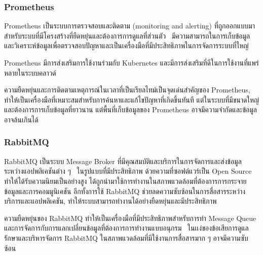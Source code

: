\documentclass[12pt,oneside,openright,a4paper]{cpe-thai-project}
\begin{document}
        \subsubsection{Prometheus}
            \begin{flushleft}
                Prometheus เป็นระบบการตรวจสอบและติดตาม (monitoring and alerting) ที่ถูกออกแบบมาสำหรับระบบที่มีโครงสร้างที่ยืดหยุ่นและต้องการการดูแลที่ส่วนตัว~\cite{prometheus} มีความสามารถในการเก็บข้อมูลและวิเคราะห์ข้อมูลเพื่อตรวจสอบปัญหาและเป็นเครื่องมือที่มีประสิทธิภาพในการจัดการระบบที่ใหญ่ 
            \begin{flushleft}
                Prometheus มีการส่งเสริมการใช้งานร่วมกับ Kubernetes และมีการส่งเสริมที่ดีในการใช้งานที่แพร่หลายในระบบคลาวด์
            \end{flushleft}
            \end{flushleft}
            \begin{flushleft}
                ความยืดหยุ่นและการติดตามเหตุการณ์ในเวลาที่เป็นเรียลไทม์เป็นจุดเด่นสำคัญของ Prometheus, ทำให้เป็นเครื่องมือที่เหมาะสมสำหรับการค้นหาและแก้ไขปัญหาที่เกิดขึ้นทันที แต่ในระบบที่มีขนาดใหญ่และต้องการการเก็บข้อมูลที่ยาวนาน แต่พื้นที่เก็บข้อมูลของ Prometheus อาจมีความจำกัดและข้อมูลอาจล้นเกินได้
            \end{flushleft}

        \subsubsection{RabbitMQ}
            \begin{flushleft}
                RabbitMQ เป็นระบบ Message Broker ที่มีคุณสมบัติและบริการในการจัดการและส่งข้อมูลระหว่างแอปพลิเคชันต่าง ๆ~\cite{rabbitmq} ในรูปแบบที่มีประสิทธิภาพ ด้วยความที่ซอฟต์แวร์เป็น Open Source ทำให้ได้รับความนิยมเป็นอย่างสูง ได้ถูกนำมาใช้การทำงานในสภาพแวดล้อมที่ต้องการการกระจายข้อมูลและการคอมมูนิเคชัน อีกทั้งการใช้ RabbitMQ ช่วยลดความซับซ้อนในการสื่อสารระหว่างบริการและแอปพลิเคชัน, ทำให้ระบบสามารถทำงานได้อย่างยืดหยุ่นและมีประสิทธิภาพ~\cite{rabbitmq}
            \end{flushleft}
            \begin{flushleft}
                ความยืดหยุ่นของ RabbitMQ ทำให้เป็นเครื่องมือที่มีประสิทธิภาพสำหรับการทำ Message Queue และการจัดการกับการแลกเปลี่ยนข้อมูลที่ต้องการการทำงานแบบอนุกรม~\cite{videla17rabbitmq} ในเเง่ของข้อเสียการดูแลรักษาและบริหารจัดการ RabbitMQ ในสภาพแวดล้อมที่มีใช้งานการสื่อสารมาก ๆ อาจมีความซับซ้อน~\cite{hanwell17rabbitmq}
            \end{flushleft}   
\pagebreak
\end{document}
